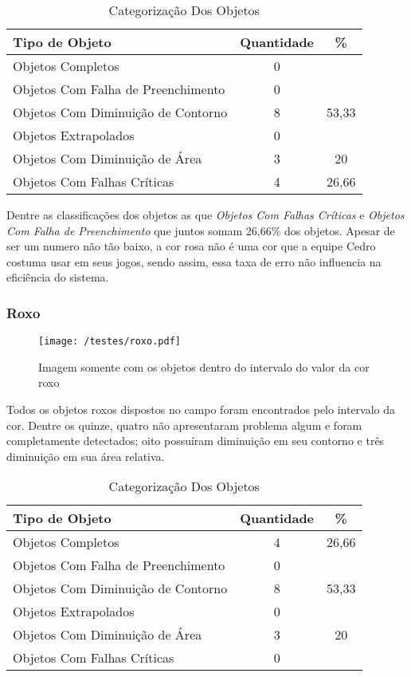 	\begin{table}[h]
\centering
\begin{tabular}{l|c|c}
Tipo de Objeto & Quantidade  & \% \\ %
\hline                               %
Objetos Completos &  0\\
\hline 
Objetos Com Falha de Preenchimento & 0\\
\hline 
Objetos Com Diminuição de Contorno & 8& 53,33
 \\
\hline 
Objetos Extrapolados & 0 \\
\hline 
Objetos Com Diminuição de Área & 3 & 20\\
\hline 
Objetos Com Falhas Críticas & 4 & 26,66 \\
\hline 
\end{tabular}
\caption{Categorização Dos Objetos}
\end{table}

Dentre as classificações dos objetos as que  \textit{Objetos Com Falhas Críticas} e \textit{Objetos Com Falha de Preenchimento} que juntos somam 26,66\% dos objetos. Apesar de ser um numero não tão baixo, a cor rosa não é uma cor que a equipe Cedro costuma usar em seus jogos, sendo assim, essa taxa de erro não influencia na eficiência do sistema.
\subsubsection{Roxo}
\begin{figure}[H]
		\centering
		\texttt{[image: /testes/roxo.pdf]}
		\caption{Imagem somente com os objetos dentro do intervalo do valor da cor roxo}
		\label{disposicaoparte}
	\end{figure}

Todos os objetos roxos dispostos no campo foram encontrados pelo intervalo da cor. Dentre os quinze, quatro não apresentaram problema algum e foram completamente detectados; oito possuíram diminuição em seu contorno e três diminuição em sua área relativa.
\begin{table}[h]
\centering
\begin{tabular}{l|c|c}
Tipo de Objeto & Quantidade  & \% \\ %
\hline                               %
Objetos Completos &  4 & 26,66\\
\hline 
Objetos Com Falha de Preenchimento & 0 \\
\hline 
Objetos Com Diminuição de Contorno &  8 & 53,33\\
\hline 
Objetos Extrapolados & 0 \\
\hline 
Objetos Com Diminuição de Área & 3 & 20\\
\hline 
Objetos Com Falhas Críticas & 0 \\
\hline 
\end{tabular}
\caption{Categorização Dos Objetos}
\end{table}
	
